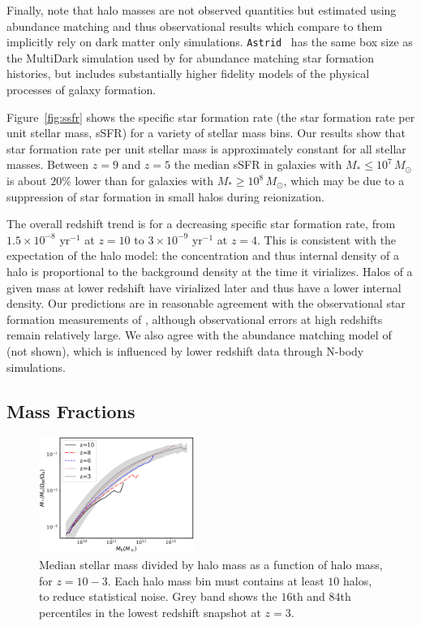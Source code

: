 \documentclass[fleqn,usenatbib]{mnras}
\def\astrid{\texttt{Astrid} }
\def\msun{\, M_{\odot}}
\begin{document}
Finally, note that halo masses are not observed quantities but estimated using abundance matching and thus observational results which compare to them implicitly rely on dark matter only simulations. \astrid~has the same box size as the MultiDark simulation \citep{2016MNRAS.457.4340K} used by \cite{2019MNRAS.488.3143B} for abundance matching star formation histories, but includes substantially higher fidelity models of the physical processes of galaxy formation.

Figure~\ref{fig:ssfr} shows the specific star formation rate (the star formation rate per unit stellar mass, sSFR) for a variety of stellar mass bins. Our results show that star formation rate per unit stellar mass is approximately constant for all stellar masses. Between $z=9$ and $z=5$ the median sSFR in galaxies with $M_* \leq 10^7 \msun$ is about $20\%$ lower than for galaxies with $M_* \geq 10^8 \msun$, which may be due to a suppression of star formation in small halos during reionization.

The overall redshift trend is for a decreasing specific star formation rate, from $1.5 \times 10^{-8}$ yr$^{-1}$ at $z=10$ to $3 \times 10^{-9}$ yr$^{-1}$ at $z=4$. This is consistent with the expectation of the halo model: the concentration and thus internal density of a halo is proportional to the background density at the time it virializes. Halos of a given mass at lower redshift have virialized later and thus have a lower internal density. Our predictions are in reasonable agreement with the observational star formation measurements of \cite{2015ApJ...799..183S}, although observational errors at high redshifts remain relatively large. We also agree with the abundance matching model of \cite{2013ApJ...770...57B} (not shown), which is influenced by lower redshift data through N-body simulations.

\subsection{Mass Fractions}

\begin{figure}
\centering
  \includegraphics[width=0.45\textwidth]{plots/smhms.pdf}
  \caption{Median stellar mass divided by halo mass as a function of halo mass, for $z=10-3$. Each halo mass bin must contains at least $10$ halos, to reduce statistical noise. Grey band shows the $16$th and $84$th percentiles in the lowest redshift snapshot at $z=3$.}
  \label{fig:smhm}
\end{figure}
\end{document}
